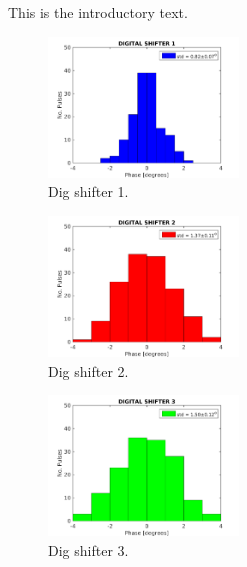 
This is the introductory text.






\begin{figure}
  \centering
  \includegraphics[width=0.45\textwidth]{Figures/PhMon_HistDig1}
  \caption{Dig shifter 1.}
  \label{f:PhMon_HistDig1}
\end{figure}

\begin{figure}
  \centering
  \includegraphics[width=0.45\textwidth]{Figures/PhMon_HistDig2}
  \caption{Dig shifter 2.}
  \label{f:PhMon_HistDig2}
\end{figure}

\begin{figure}
  \centering
  \includegraphics[width=0.45\textwidth]{Figures/PhMon_HistDig3}
  \caption{Dig shifter 3.}
  \label{f:PhMon_HistDig3}
\end{figure}

